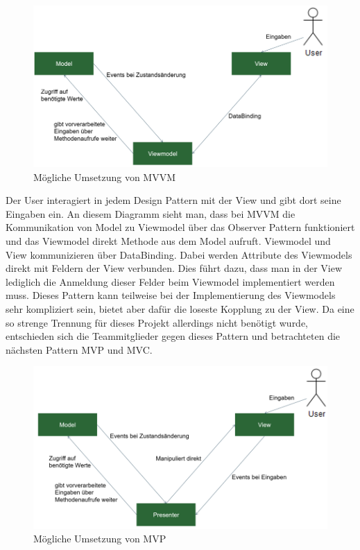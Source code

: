 
\begin{figure}[!h]
	\includegraphics[width=1\columnwidth]{img/design-pattern-mvvm}
	\caption[Mögliche Umsetzung von MVVM ]{Mögliche Umsetzung von MVVM\footnotemark}
\end{figure}


Der User interagiert in jedem Design Pattern mit der View und gibt dort seine Eingaben ein. An diesem Diagramm sieht man, dass bei MVVM die Kommunikation von Model zu Viewmodel über das Observer Pattern funktioniert und das Viewmodel direkt Methode aus dem Model aufruft. Viewmodel und View kommunizieren über DataBinding. Dabei werden Attribute des Viewmodels direkt mit Feldern der View verbunden. Dies führt dazu, dass man in der View lediglich die Anmeldung dieser Felder beim Viewmodel implementiert werden muss. Dieses Pattern kann teilweise bei der Implementierung des Viewmodels sehr kompliziert sein, bietet aber dafür die loseste Kopplung zu der View. Da eine so strenge Trennung für dieses Projekt allerdings nicht benötigt wurde, entschieden sich die Teammitglieder gegen dieses Pattern und betrachteten die nächsten Pattern MVP und MVC. 


\begin{figure}[!h]
	\includegraphics[width=1\columnwidth]{img/design-pattern-moeglich-mvp}
	\caption[Mögliche Umsetzung von MVP]{Mögliche Umsetzung von MVP\footnotemark}
\end{figure}

